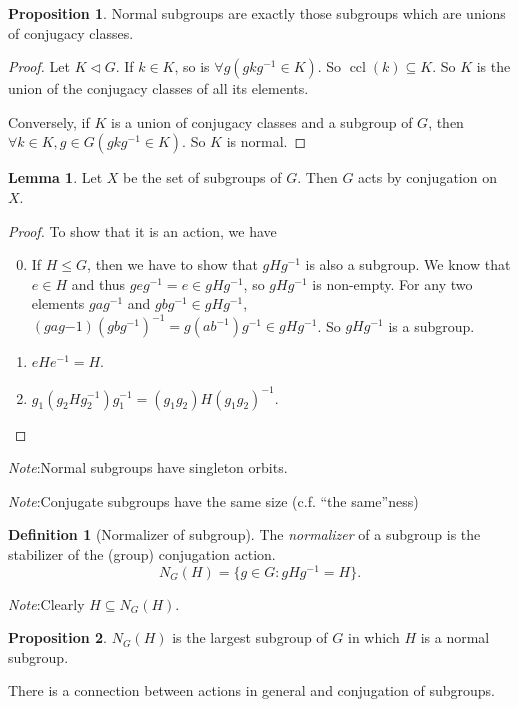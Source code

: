 \documentclass[a4paper]{article}
\theoremstyle{definition}
\newtheorem*{prop}{Proposition}
\newtheorem*{defi}{Definition}
\newtheorem*{lemma}{Lemma}
\newcommand{\note}{\noindent \emph{Note}:\;}
\DeclareMathOperator\ccl{ccl}
\begin{document}
\begin{prop}
  Normal subgroups are exactly those subgroups which are unions of conjugacy classes.
\end{prop}

\begin{proof}
  Let $K\lhd G$. If $k\in K$, so is $\forall g(gkg^{-1}\in K)$. So $\ccl(k)\subseteq K$. So $K$ is the union of the conjugacy classes of all its elements.

  Conversely, if $K$ is a union of conjugacy classes and a subgroup of $G$, then $\forall k\in K, g\in G(gkg^{-1}\in K)$. So $K$ is normal.
\end{proof}

\begin{lemma}
  Let $X$ be the set of subgroups of $G$. Then $G$ acts by conjugation on $X$. 
\end{lemma}

\begin{proof}
  To show that it is an action, we have
  \begin{enumerate}[label=\arabic{*}.]
    \setcounter{enumi}{-1}
  \item If $H\leq G$, then we have to show that $gHg^{-1}$ is also a subgroup. We know that $e\in H$ and thus $geg^{-1} = e\in gHg^{-1}$, so $gHg^{-1}$ is non-empty. For any two elements $gag^{-1}$ and $gbg^{-1}\in gHg^{-1}$, $(gag{-1})(gbg^{-1})^{-1} = g(ab^{-1})g^{-1}\in gHg^{-1}$. So $gHg^{-1}$ is a subgroup.
  \item $eHe^{-1} = H$.
  \item $g_1(g_2Hg_2^{-1})g_1^{-1} = (g_1g_2)H(g_1g_2)^{-1}$.
  \end{enumerate}
\end{proof}
\note Normal subgroups have singleton orbits.

\note Conjugate subgroups have the same size (c.f. ``the same''ness)

\begin{defi}[Normalizer of subgroup]
  The \emph{normalizer} of a subgroup is the stabilizer of the (group) conjugation action.
  \[
  N_G(H) = \{g\in G: gHg^{-1} = H\}.
  \]
\end{defi}
\note Clearly $H\subseteq N_G(H)$.

\begin{prop}
  $N_G(H)$ is the largest subgroup of $G$ in which $H$ is a normal subgroup.
\end{prop}

There is a connection between actions in general and conjugation of subgroups.
\end{document}
